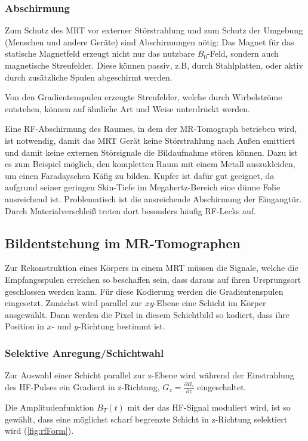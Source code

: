 \subsubsection{Abschirmung}
Zum Schutz des MRT vor externer Störstrahlung und zum Schutz der Umgebung (Menschen und andere Geräte) sind Abschirmungen nötig:
Das Magnet für das statische Magnetfeld erzeugt nicht nur das nutzbare $B_0$-Feld, sondern auch magnetische Streufelder. Diese können passiv, z.B, durch Stahlplatten, oder aktiv durch zusätzliche Spulen abgeschirmt werden.

Von den Gradientenspulen erzeugte Streufelder, welche durch Wirbelströme entstehen, können auf ähnliche Art und Weise unterdrückt werden.

Eine RF-Abschirmung des Raumes, in dem der MR-Tomograph betrieben wird, ist notwendig, damit das MRT Gerät keine Störstrahlung nach Außen emittiert und damit keine externen Störsignale die Bildaufnahme stören können.
Dazu ist es zum Beispiel möglich, den kompletten Raum mit einem Metall auszukleiden, um einen Faradayschen Käfig zu bilden. Kupfer ist dafür gut geeignet, da aufgrund seiner geringen Skin-Tiefe im Megahertz-Bereich eine dünne Folie ausreichend ist. \cite{Weibler1993} Problematisch ist die ausreichende Abschirmung der Eingangtür. Durch Materialverschleiß treten dort besonders häufig RF-Lecks auf.

\subsection{Bildentstehung im MR-Tomographen}
Zur Rekonstruktion eines Körpers in einem MRT müssen die Signale, welche die Empfangsspulen erreichen so beschaffen sein, dass daraus auf ihren Ursprungsort geschlossen werden kann. Für diese Kodierung werden die Gradientenspulen eingesetzt. Zunächst wird parallel zur $xy$-Ebene eine Schicht im Körper ausgewählt. Dann werden die Pixel in diesem Schichtbild so kodiert, dass ihre Position in $x$- und $y$-Richtung bestimmt ist.

\subsubsection{Selektive Anregung/Schichtwahl}
Zur Auswahl einer Schicht parallel zur z-Ebene wird während der Einstrahlung des HF-Pulses ein Gradient in z-Richtung, $G_z=\frac{\partial B_z}{\partial z}$ eingeschaltet.

Die Amplitudenfunktion $B_T(t)$ mit der das HF-Signal moduliert wird, ist so gewählt, dass eine möglichst scharf begrenzte Schicht in z-Richtung selektiert wird (\autoref{fig:rfForm}).


